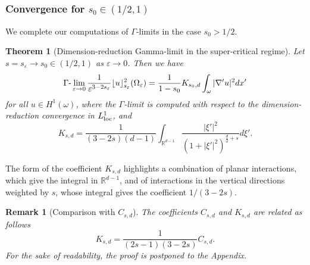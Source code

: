 \documentclass[11pt]{article}
\newtheorem{theorem}[definition]{Theorem}
\newtheorem{remark}[definition]{Remark}
\def\e{\varepsilon}
\begin{document}
\subsubsection{Convergence for $s_0\in(1/2,1)$}
We complete our computations of $\Gamma$-limits in the case $s_0>1/2$.

\begin{theorem}[Dimension-reduction Gamma-limit in the super-critical regime]\label{Gammaths0} Let $s=s_\e\to s_0\in(1/2,1)$ as $\e\to 0$. 
Then we have
$$
\Gamma\hbox{-}\lim_{\e\to 0} \frac{1}{\e^{3-2s_\e}}\lfloor u\rfloor_{s_\e}^2(\Omega_\e)= \frac1{1-s_0} K_{s_0,d}\int_\omega |\nabla'u|^2dx'
$$
for all $u\in H^1(\omega)$, where the $\Gamma$-limit is computed with respect to the dimension-reduction convergence in $L^1_{\rm loc}$, and
\begin{equation}
K_{s,d}=  \frac{1}{(3-2s)(d-1)} \int_{
 \mathbb R^{d-1}}\frac{|\xi'|^2}{(1+|\xi'|^2)^{\frac d2+s}}d\xi'.
\end{equation}
\end{theorem}

The form of the coefficient $K_{s,d}$ highlights a combination of planar interactions, which give the integral in $\mathbb R^{d-1}$, and of interactions in the vertical directions weighted by $s$, whose integral gives the coefficient $1/(3-2s)$.

\begin{remark}[Comparison with $C_{s,d}$]\label{Ksd}\rm 
The coefficients $C_{s,d}$ and $K_{s,d}$ are related as follows \begin{equation}\label{CK}
K_{s,d}=\frac{1}{(2s-1)(3-2s)}C_{s,d}.
\end{equation}
For the sake of readability, the proof is postponed to the Appendix.
\end{remark}
\end{document}
